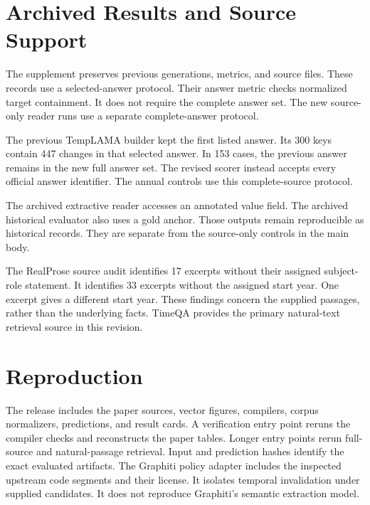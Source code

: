 \section{Archived Results and Source Support}
\label{app:archive}
The supplement preserves previous generations, metrics, and source files.
These records use a selected-answer protocol.
Their answer metric checks normalized target containment.
It does not require the complete answer set.
The new source-only reader runs use a separate complete-answer protocol.

The previous TempLAMA builder kept the first listed answer.
Its 300 keys contain 447 changes in that selected answer.
In 153 cases, the previous answer remains in the new full answer set.
The revised scorer instead accepts every official answer identifier.
The annual controls use this complete-source protocol.

The archived extractive reader accesses an annotated value field.
The archived historical evaluator also uses a gold anchor.
Those outputs remain reproducible as historical records.
They are separate from the source-only controls in the main body.

The RealProse source audit identifies 17 excerpts without their assigned subject-role statement.
It identifies 33 excerpts without the assigned start year.
One excerpt gives a different start year.
These findings concern the supplied passages, rather than the underlying facts.
TimeQA provides the primary natural-text retrieval source in this revision.

\section{Reproduction}
\label{app:reproduction}
The release includes the paper sources, vector figures, compilers, corpus normalizers, predictions, and result cards.
A verification entry point reruns the compiler checks and reconstructs the paper tables.
Longer entry points rerun full-source and natural-passage retrieval.
Input and prediction hashes identify the exact evaluated artifacts.
The Graphiti policy adapter includes the inspected upstream code segments and their license.
It isolates temporal invalidation under supplied candidates.
It does not reproduce Graphiti's semantic extraction model.












